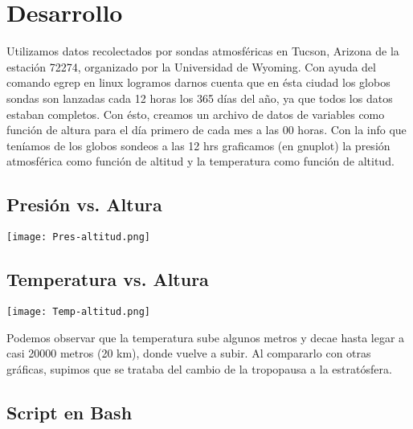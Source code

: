 \documentclass[12pt]{article}
\begin{document}
\section{Desarrollo}
\noindent Utilizamos datos recolectados por sondas atmosféricas en Tucson, Arizona de la estación 72274, organizado por la Universidad de Wyoming. \cite{bib}
Con ayuda del comando egrep en linux logramos darnos cuenta que en \'esta ciudad los globos sondas son lanzadas cada 12 horas los 365 d\'ias del año, ya que todos los datos estaban completos. Con ésto, creamos un archivo de datos de variables como función de altura para el día primero de cada mes a las 00 horas. Con la info que teníamos de los globos sondeos a las 12 hrs graficamos (en gnuplot) la presión atmosférica como función de altitud y la temperatura como función de altitud. 
\begin{center}
\subsection*{Presi\'on vs. Altura}
\texttt{[image: Pres-altitud.png]}
\subsection*{Temperatura vs. Altura}
\texttt{[image: Temp-altitud.png]}
\end{center}

Podemos observar que la temperatura sube algunos metros y decae hasta legar a casi 20000 metros (20 km), donde vuelve a subir. Al compararlo con otras gr\'aficas, supimos que se trataba del cambio de la tropopausa a la estrat\'osfera. \cite{b}

\subsection{Script en Bash}
\end{document}
